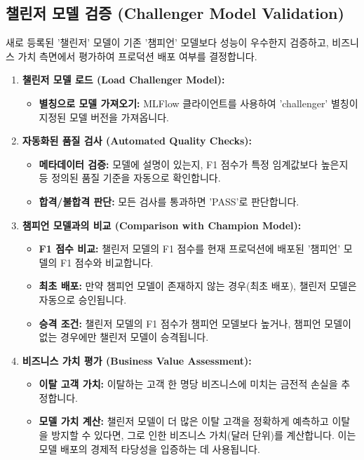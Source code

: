 \documentclass[11pt,a4paper]{article}
\begin{document}
\subsection{챌린저 모델 검증 (Challenger Model Validation)}

\begin{summarybox}
새로 등록된 '챌린저' 모델이 기존 '챔피언' 모델보다 성능이 우수한지 검증하고, 비즈니스 가치 측면에서 평가하여 프로덕션 배포 여부를 결정합니다.
\end{summarybox}

\begin{enumerate}
    \item \textbf{챌린저 모델 로드 (Load Challenger Model):}
    \begin{itemize}
        \item \textbf{별칭으로 모델 가져오기:} MLFlow 클라이언트를 사용하여 'challenger' 별칭이 지정된 모델 버전을 가져옵니다.
    \end{itemize}

    \item \textbf{자동화된 품질 검사 (Automated Quality Checks):}
    \begin{itemize}
        \item \textbf{메타데이터 검증:} 모델에 설명이 있는지, F1 점수가 특정 임계값보다 높은지 등 정의된 품질 기준을 자동으로 확인합니다.
        \item \textbf{합격/불합격 판단:} 모든 검사를 통과하면 'PASS'로 판단합니다.
    \end{itemize}

    \item \textbf{챔피언 모델과의 비교 (Comparison with Champion Model):}
    \begin{itemize}
        \item \textbf{F1 점수 비교:} 챌린저 모델의 F1 점수를 현재 프로덕션에 배포된 '챔피언' 모델의 F1 점수와 비교합니다.
        \item \textbf{최초 배포:} 만약 챔피언 모델이 존재하지 않는 경우(최초 배포), 챌린저 모델은 자동으로 승인됩니다.
        \item \textbf{승격 조건:} 챌린저 모델의 F1 점수가 챔피언 모델보다 높거나, 챔피언 모델이 없는 경우에만 챌린저 모델이 승격됩니다.
    \end{itemize}

    \item \textbf{비즈니스 가치 평가 (Business Value Assessment):}
    \begin{itemize}
        \item \textbf{이탈 고객 가치:} 이탈하는 고객 한 명당 비즈니스에 미치는 금전적 손실을 추정합니다.
        \item \textbf{모델 가치 계산:} 챌린저 모델이 더 많은 이탈 고객을 정확하게 예측하고 이탈을 방지할 수 있다면, 그로 인한 비즈니스 가치(달러 단위)를 계산합니다. 이는 모델 배포의 경제적 타당성을 입증하는 데 사용됩니다.
    \end{itemize}


\end{enumerate}
\end{document}
